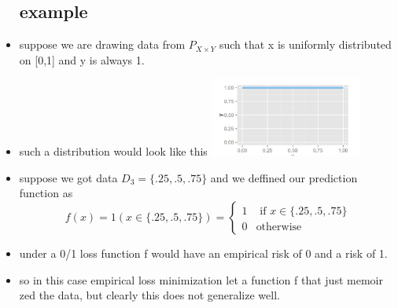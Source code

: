 \documentclass{article}
\begin{document}
\begin{itemize}
\subsection{example}
\item suppose we are drawing data from $P_{X\times Y}$ such that x is uniformly distributed on [0,1] and y is always 1. 
\item such a distribution would look like this \includegraphics[width=5cm]{lecture_notes/lecture_1/plot_1.jpg}
\item suppose we got data $D_{3}=\{.25,.5,.75\}$ and we deffined our prediction function as \begin{equation*}
f(x) = 1(x\in\{.25,.5,.75\}) = \left\{
        \begin{array}{ll}
            1 & \text{ if } x \in \{.25,.5,.75\}  \\
            0 & \text{otherwise}
        \end{array}
    \right.
\end{equation*}
\item under a 0/1 loss function f would have an empirical risk of 0 and a risk of 1. 
\item so in this case empirical loss minimization let a function f that just memoir zed the data, but clearly this does not generalize well.

\end{itemize}
\end{document}
